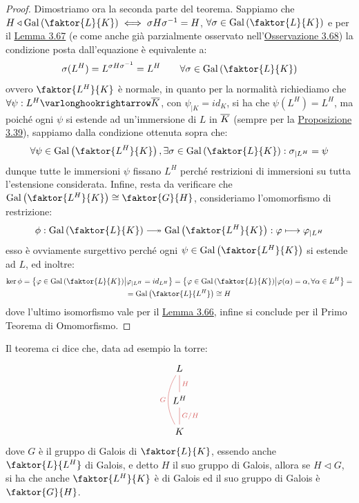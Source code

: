 \documentclass[11pt]{scrartcl}
\begin{document}
\begin{proof}
    Dimostriamo ora la seconda parte del teorema. Sappiamo che $H \triangleleft \Gal\left(\faktor{L}{K}\right) \iff \sigma H\sigma^{-1} = H$, $\forall \sigma \in \Gal\left(\faktor{L}{K}\right)$ e per il 
    \hyperref[3.67]{Lemma 3.67} (e come anche già parzialmente osservato nell'\hyperref[3.68]{Osservazione 3.68}) la condizione posta dall'equazione è equivalente a:
    \[ \sigma(L^H) = L^{\sigma H \sigma^{-1}} = L^H \qquad \forall \sigma \in \Gal\left(\faktor{L}{K}\right)
        \]
    ovvero $\faktor{L^H}{K}$ è normale, in quanto per la normalità richiediamo che $\forall \psi : L^H \varlonghookrightarrow \ol K$, con $\psi_{|K} = id_K$, si ha che $\psi(L^H) = L^H$, ma poiché ogni $\psi$ si estende ad un'immersione 
    di $L$ in $\overline K$ (sempre per la \hyperref[3.39]{Proposizione 3.39}), sappiamo dalla condizione ottenuta sopra che:
    \[ \forall \psi \in \Gal\left(\faktor{L^H}{K}\right), \exists \sigma \in \Gal\left(\faktor{L}{K}\right) : \sigma_{|L^H} = \psi
        \]
    dunque tutte le immersioni $\psi$ fissano $L^H$ perché restrizioni di immersioni su tutta l'estensione considerata.
    Infine, resta da verificare che $\Gal\left(\faktor{L^H}{K}\right) \cong \faktor{G}{H}$, consideriamo l'omomorfismo di restrizione:
    \[ \phi : \Gal\left(\faktor{L}{K}\right) \twoheadlongrightarrow \Gal\left(\faktor{L^H}{K}\right) : \varphi \longmapsto \varphi_{|L^H}
        \]
    esso è ovviamente surgettivo perché ogni $\psi \in \Gal\left(\faktor{L^H}{K}\right)$ si estende ad $L$, ed inoltre:
    \begin{multline*}
        \ker \phi = \left\{\varphi \in \Gal\left(\faktor{L}{K}\right) \m \varphi_{|L^H} = id_{L^H} \right\} = \left\{\varphi \in \Gal\left(\faktor{L}{K}\right) \m \varphi(\alpha) = \alpha, \forall \alpha \in L^H\right\} = \\ 
        = \Gal\left(\faktor{L}{L^H}\right) \cong H
    \end{multline*}
    dove l'ultimo isomorfismo vale per il \hyperref[3.66]{Lemma 3.66}, infine si conclude per il Primo Teorema di Omomorfismo.
\end{proof}

\begin{example}
    Il teorema ci dice che, data ad esempio la torre:
    \[\begin{tikzcd}
        L \\
        {L^H} \\
        K
        \arrow["G", color={rgb,255:red,214;green,92;blue,92}, bend left, no head, from=3-1, to=1-1]
        \arrow["{G/H}"', color={rgb,255:red,214;green,92;blue,92}, no head, from=3-1, to=2-1]
        \arrow["H"', color={rgb,255:red,214;green,92;blue,92}, no head, from=2-1, to=1-1]
    \end{tikzcd}\]
    dove $G$ è il gruppo di Galois di $\faktor{L}{K}$, essendo anche $\faktor{L}{L^H}$ di Galois,
    e detto $H$ il suo gruppo di Galois, allora se $H \triangleleft G$,
    si ha che anche $\faktor{L^H}{K}$ è di Galois ed il suo gruppo di Galois è $\faktor{G}{H}$.
\end{example}
\end{document}
